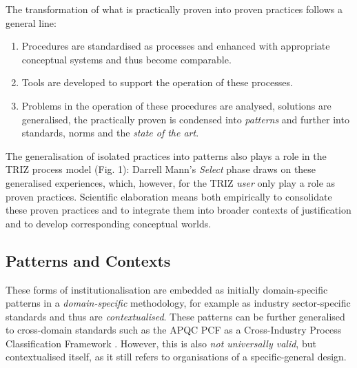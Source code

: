 \documentclass[11pt,a4paper]{article}
\begin{document}
The transformation of what is practically proven into proven practices follows
a general line:
\begin{enumerate}
\item Procedures are standardised as processes and enhanced with appropriate
  conceptual systems and thus become comparable.
\item Tools are developed to support the operation of these processes.
\item Problems in the operation of these procedures are analysed, solutions
  are generalised, the practically proven is condensed into \emph{patterns}
  and further into standards, norms and the \emph{state of the art}.
\end{enumerate}
The generalisation of isolated practices into patterns also plays a role in
the TRIZ process model (Fig. 1): Darrell Mann's \emph{Select} phase draws on
these generalised experiences, which, however, for the TRIZ \emph{user} only
play a role as proven practices. Scientific elaboration means both empirically
to consolidate these proven practices and to integrate them into broader
contexts of justification and to develop corresponding conceptual worlds.

\subsection{Patterns and Contexts}

These forms of institutionalisation are embedded as initially domain-specific
patterns in a \emph{domain-specific} methodology, for example as industry
sector-specific standards and thus are \emph{contextualised}.  These patterns
can be further generalised to cross-domain standards such as the APQC PCF as a
Cross-Industry Process Classification Framework \cite{APQC}.  However, this is
also \emph{not universally valid}, but contextualised itself, as it still
refers to organisations of a specific-general design.
\end{document}
